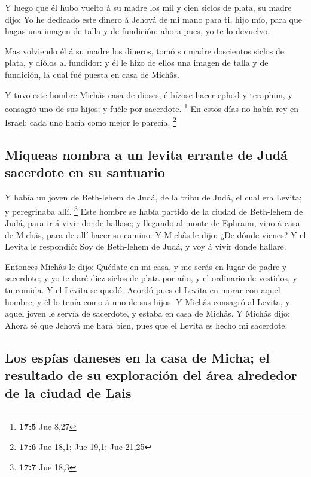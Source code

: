  Y luego que él hubo vuelto á su madre los mil y cien
siclos de plata, su madre dijo: Yo he dedicado este dinero á Jehová de
mi mano para ti, hijo mío, para que hagas una imagen de talla y de
fundición: ahora pues, yo te lo devuelvo.

 Mas volviendo él á su madre los dineros, tomó su madre
doscientos siclos de plata, y diólos al fundidor: y él le hizo de ellos
una imagen de talla y de fundición, la cual fué puesta en casa de
Michâs.

 Y tuvo este hombre Michâs casa de dioses, é hízose hacer
ephod y teraphim, y consagró uno de sus hijos; y fuéle por sacerdote.
\footnote{\textbf{17:5} Jue 8,27}  En estos días no había
rey en Israel: cada uno hacía como mejor le parecía. \footnote{\textbf{17:6}
  Jue 18,1; Jue 19,1; Jue 21,25}

\hypertarget{miqueas-nombra-a-un-levita-errante-de-juduxe1-sacerdote-en-su-santuario}{%
\subsection{Miqueas nombra a un levita errante de Judá sacerdote en su
santuario}\label{miqueas-nombra-a-un-levita-errante-de-juduxe1-sacerdote-en-su-santuario}}

 Y había un joven de Beth-lehem de Judá, de la tribu de
Judá, el cual era Levita; y peregrinaba allí. \footnote{\textbf{17:7}
  Jue 18,3}  Este hombre se había partido de la ciudad de
Beth-lehem de Judá, para ir á vivir donde hallase; y llegando al monte
de Ephraim, vino á casa de Michâs, para de allí hacer su camino.
 Y Michâs le dijo: ¿De dónde vienes? Y el Levita le
respondió: Soy de Beth-lehem de Judá, y voy á vivir donde hallare.

 Entonces Michâs le dijo: Quédate en mi casa, y me serás
en lugar de padre y sacerdote; y yo te daré diez siclos de plata por
año, y el ordinario de vestidos, y tu comida. Y el Levita se quedó.
 Acordó pues el Levita en morar con aquel hombre, y él lo
tenía como á uno de sus hijos.  Y Michâs consagró al
Levita, y aquel joven le servía de sacerdote, y estaba en casa de
Michâs.  Y Michâs dijo: Ahora sé que Jehová me hará bien,
pues que el Levita es hecho mi sacerdote.

\hypertarget{los-espuxedas-daneses-en-la-casa-de-micha-el-resultado-de-su-exploraciuxf3n-del-uxe1rea-alrededor-de-la-ciudad-de-lais}{%
\subsection{Los espías daneses en la casa de Micha; el resultado de su
exploración del área alrededor de la ciudad de
Lais}\label{los-espuxedas-daneses-en-la-casa-de-micha-el-resultado-de-su-exploraciuxf3n-del-uxe1rea-alrededor-de-la-ciudad-de-lais}}

